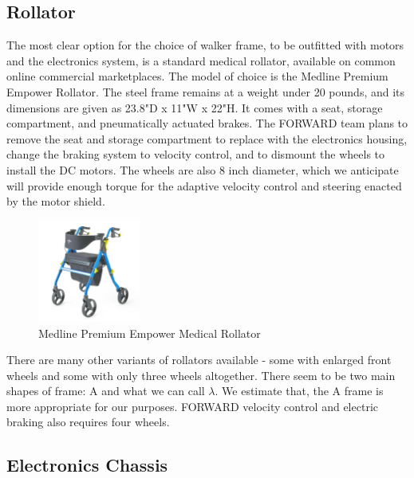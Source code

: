 \subsection{Rollator}
\noindent The most clear option for the choice of walker frame, to be outfitted with motors and the electronics system, is a standard medical rollator, available on common online commercial marketplaces. The model of choice is the Medline Premium Empower Rollator. The steel frame remains at a weight under 20 pounds, and its dimensions are given as 23.8"D x 11"W x 22"H. It comes with a seat, storage compartment, and pneumatically actuated brakes. The FORWARD team plans to remove the seat and storage compartment to replace with the electronics housing, change the braking system to velocity control, and to dismount the wheels to install the DC motors. The wheels are also 8 inch diameter, which we anticipate will provide enough torque for the adaptive velocity control and steering enacted by the motor shield.\\

\begin{figure}[H]
	\centering
	\includegraphics[width=0.3\textwidth]{./Images/rollator-amaz.jpg}
	\caption{\label{fig:rollator-amaz}Medline Premium Empower Medical Rollator}
\end{figure}

\noindent There are many other variants of rollators available - some with enlarged front wheels and some with only three wheels altogether. There seem to be two main shapes of frame: A and what we can call $\lambda$. We estimate that, the A frame is more appropriate for our purposes. FORWARD velocity control and electric braking also requires four wheels.\\


\subsection{Electronics Chassis} \label{chassis}
